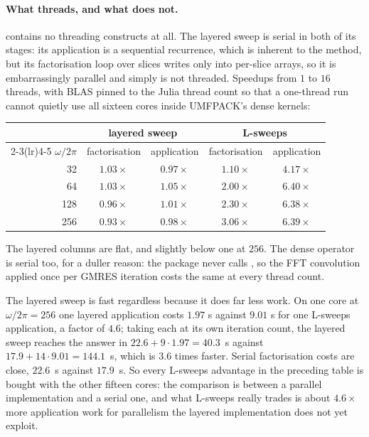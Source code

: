 \documentclass[11pt]{article}
\begin{document}
\paragraph{What threads, and what does not.}  contains no threading
constructs at all. The layered sweep is serial in both of its stages: its application is a
sequential recurrence, which is inherent to the method, but its factorisation loop over
slices writes only into per-slice arrays, so it is embarrassingly parallel and simply is
not threaded. Speedups from $1$ to $16$ threads, with BLAS pinned to the Julia thread count
so that a one-thread run cannot quietly use all sixteen cores inside UMFPACK's dense
kernels:
\begin{center}\small
\begin{tabular}{rcccc}
\toprule
& \multicolumn{2}{c}{layered sweep} & \multicolumn{2}{c}{L-sweeps} \\
\cmidrule(lr){2-3}\cmidrule(lr){4-5}
$\omega/2\pi$ & factorisation & application & factorisation & application \\
\midrule
 32 & $1.03\times$ & $0.97\times$ & $1.10\times$ & $4.17\times$ \\
 64 & $1.03\times$ & $1.05\times$ & $2.00\times$ & $6.40\times$ \\
128 & $0.96\times$ & $1.01\times$ & $2.30\times$ & $6.38\times$ \\
256 & $0.93\times$ & $0.98\times$ & $3.06\times$ & $6.39\times$ \\
\bottomrule
\end{tabular}
\end{center}
The layered columns are flat, and slightly below one at $256$. The dense operator is serial
too, for a duller reason: the package never calls , so the FFT
convolution applied once per GMRES iteration costs the same at every thread count.

The layered sweep is fast regardless because it does far less work. On one core at
$\omega/2\pi=256$ one layered application costs $1.97$ s against $9.01$ s for one L-sweeps
application, a factor of $4.6$; taking each at its own iteration count, the layered sweep
reaches the answer in $22.6+9\cdot1.97=40.3$~s against $17.9+14\cdot9.01=144.1$~s, which
is $3.6$ times faster. Serial factorisation costs are close, $22.6$~s against $17.9$~s. So
every L-sweeps advantage in the preceding table is bought with the other fifteen cores: the
comparison is between a parallel implementation and a serial one, and what L-sweeps really
trades is about $4.6\times$ more application work for parallelism the layered
implementation does not yet exploit.
\end{document}
